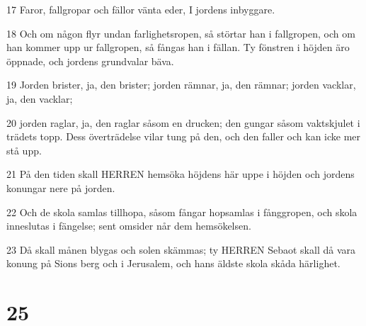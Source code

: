 \par 17 Faror, fallgropar och fällor vänta eder, I jordens inbyggare.
\par 18 Och om någon flyr undan farlighetsropen, så störtar han i fallgropen, och om han kommer upp ur fallgropen, så fångas han i fällan. Ty fönstren i höjden äro öppnade, och jordens grundvalar bäva.
\par 19 Jorden brister, ja, den brister; jorden rämnar, ja, den rämnar; jorden vacklar, ja, den vacklar;
\par 20 jorden raglar, ja, den raglar såsom en drucken; den gungar såsom vaktskjulet i trädets topp. Dess överträdelse vilar tung på den, och den faller och kan icke mer stå upp.
\par 21 På den tiden skall HERREN hemsöka höjdens här uppe i höjden och jordens konungar nere på jorden.
\par 22 Och de skola samlas tillhopa, såsom fångar hopsamlas i fånggropen, och skola inneslutas i fängelse; sent omsider når dem hemsökelsen.
\par 23 Då skall månen blygas och solen skämmas; ty HERREN Sebaot skall då vara konung på Sions berg och i Jerusalem, och hans äldste skola skåda härlighet.

\chapter{25}

